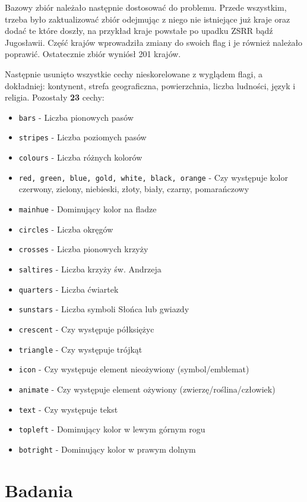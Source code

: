Bazowy zbiór należało następnie dostosować do problemu. Przede wszystkim, trzeba było zaktualizować zbiór odejmując z niego nie istniejące już kraje oraz dodać te które doszły, na przykład kraje powstałe po upadku ZSRR bądź Jugosławii. Część krajów wprowadziła zmiany do swoich flag i je również należało poprawić. Ostatecznie zbiór wyniósł 201 krajów.

Następnie usunięto wszystkie cechy nieskorelowane z wyglądem flagi, a dokładniej: kontynent, strefa geograficzna, powierzchnia, liczba ludności, język i religia. Pozostały \textbf{23} cechy:

\begin{itemize}
    \item \texttt{bars} - Liczba pionowych pasów
    \item \texttt{stripes} - Liczba poziomych pasów
    \item \texttt{colours} - Liczba różnych kolorów
    \item \texttt{red, green, blue, gold, white, black, orange} - Czy występuje kolor czerwony, zielony, niebieski, złoty, biały, czarny, pomarańczowy
    \item \texttt{mainhue} - Dominujący kolor na fladze
    \item \texttt{circles} - Liczba okręgów
    \item \texttt{crosses} - Liczba pionowych krzyży
    \item \texttt{saltires} - Liczba krzyży św. Andrzeja
    \item \texttt{quarters} - Liczba ćwiartek
    \item \texttt{sunstars} - Liczba symboli Słońca lub gwiazdy
    \item \texttt{crescent} - Czy występuje półksiężyc
    \item \texttt{triangle} - Czy występuje trójkąt
    \item \texttt{icon} - Czy występuje element nieożywiony (symbol/emblemat)
    \item \texttt{animate} - Czy występuje element ożywiony (zwierzę/roślina/człowiek)
    \item \texttt{text} - Czy występuje tekst
    \item \texttt{topleft} - Dominujący kolor w lewym górnym rogu
    \item \texttt{botright} - Dominujący kolor w prawym dolnym
\end{itemize}

\newpage

\section{Badania}

